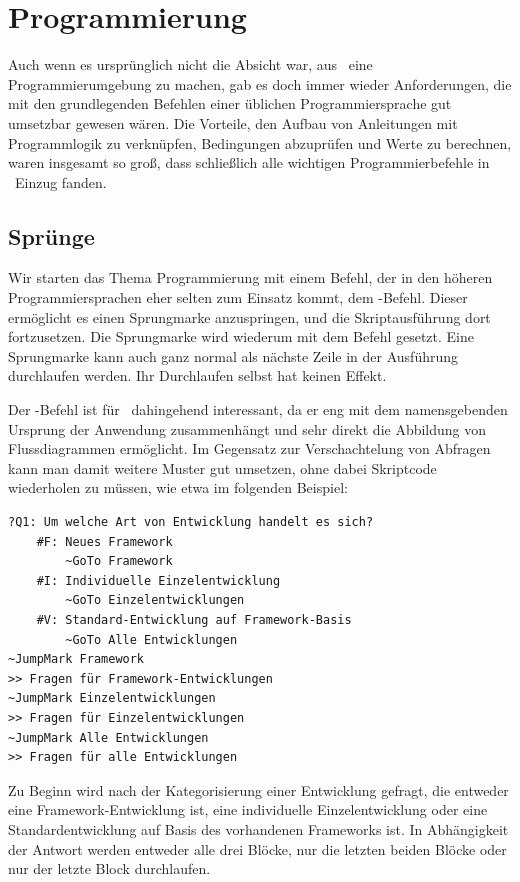 \chapter{Programmierung}
Auch wenn es ursprünglich nicht die Absicht war, aus \FPZ\ eine Programmierumgebung zu machen, gab es doch immer wieder Anforderungen, die mit den grundlegenden Befehlen einer üblichen Programmiersprache gut umsetzbar gewesen wären. Die Vorteile, den Aufbau von Anleitungen mit Programmlogik zu verknüpfen, Bedingungen abzuprüfen und Werte zu berechnen, waren insgesamt so groß, dass schließlich alle wichtigen Programmierbefehle in \FPZ\ Einzug fanden.

\section{Sprünge}\label{Spruenge}
Wir starten das Thema Programmierung mit einem Befehl, der in den höheren Programmiersprachen eher selten zum Einsatz kommt, dem -Befehl. Dieser ermöglicht es einen Sprungmarke anzuspringen, und die Skriptausführung dort fortzusetzen. Die Sprungmarke wird wiederum mit dem Befehl  gesetzt. Eine Sprungmarke kann auch ganz normal als nächste Zeile in der Ausführung durchlaufen werden. Ihr Durchlaufen selbst hat keinen Effekt.

Der -Befehl ist für \FPZ\ dahingehend interessant, da er eng mit dem namensgebenden Ursprung der Anwendung zusammenhängt und sehr direkt die Abbildung von Flussdiagrammen ermöglicht. Im Gegensatz zur Verschachtelung von Abfragen kann man damit weitere Muster gut umsetzen, ohne dabei Skriptcode wiederholen zu müssen, wie etwa im folgenden Beispiel:

\label{BspSpruenge}
\begin{verbatim}
?Q1: Um welche Art von Entwicklung handelt es sich?
    #F: Neues Framework
        ~GoTo Framework
    #I: Individuelle Einzelentwicklung
        ~GoTo Einzelentwicklungen
    #V: Standard-Entwicklung auf Framework-Basis
        ~GoTo Alle Entwicklungen
~JumpMark Framework
>> Fragen für Framework-Entwicklungen
~JumpMark Einzelentwicklungen
>> Fragen für Einzelentwicklungen 
~JumpMark Alle Entwicklungen
>> Fragen für alle Entwicklungen 
\end{verbatim}

Zu Beginn wird nach der Kategorisierung einer Entwicklung gefragt, die entweder eine Framework-Entwicklung ist, eine individuelle Einzelentwicklung oder eine Standardentwicklung auf Basis des vorhandenen Frameworks ist. In Abhängigkeit der Antwort werden entweder alle drei Blöcke, nur die letzten beiden Blöcke oder nur der letzte Block durchlaufen.

